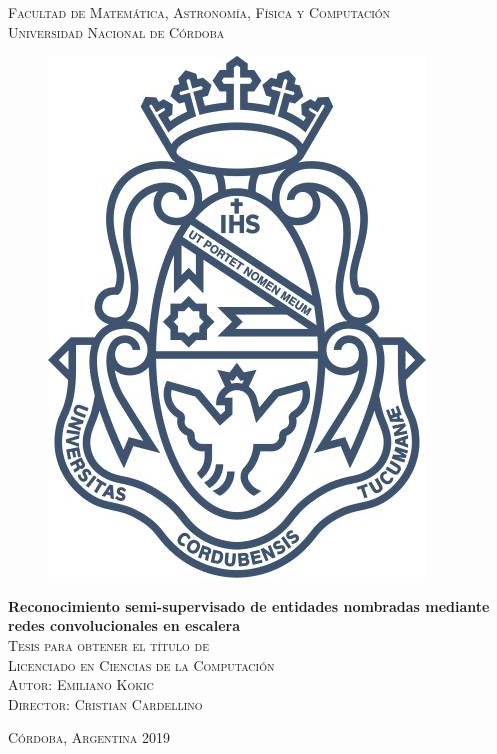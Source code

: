 \documentclass[12pt]{book}
\begin{document}
\begin{titlepage}
\begin{center}

\textsc{\Large{Facultad de Matemática, Astronomía, Física y Computación}}\\[1em]
\textsc{\large{Universidad Nacional de Córdoba}}\\[0.5em]

\begin{figure}[h]
\begin{center}
\includegraphics[width=.3\linewidth]{images/unc.jpg}
\end{center}
\end{figure}
\vspace{-0.1em}

\LARGE{\textbf{Reconocimiento semi-supervisado de entidades nombradas mediante redes convolucionales en escalera}}\\[0.5em]

\textsc{\normalsize{Tesis para obtener el título de}}\\

\textsc{\large{Licenciado en Ciencias de la Computación}}\\

\textsc{\normalsize{Autor:} \Large{Emiliano Kokic}}\\

\textsc{\normalsize{Director:} \large{Cristian Cardellino}}

\end{center}

\vspace*{\fill}
\textsc{Córdoba, Argentina \hspace*{\fill} 2019}

\end{titlepage}


\end{document}
